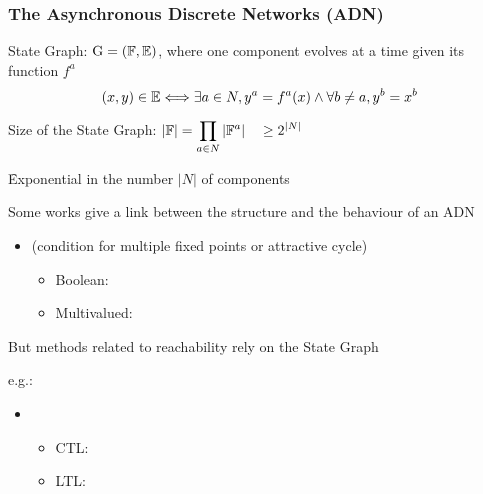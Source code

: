 \begin{frame}[c]
\begin{center}
\bigskip

\end{center}
\end{frame}



\begin{frame}[c]
  \frametitle{The Asynchronous Discrete Networks (ADN)}

State Graph: $\mathrm{G} = (\mathbb{F}, \mathbb{E})$, where one component evolves at a time given its function $f^a$
$$(x, y) \in \mathbb{E} \Longleftrightarrow \exists a \in N, y^a = f^a(x) \wedge \forall b \neq a, y^b = x^b$$


\pause
\medskip
Size of the State Graph: \quad $\displaystyle|\mathbb{F}| = \prod_{a \in N} |\mathbb{F}^a| \quad\geq 2^{|N|}$

\medskip
\f Exponential in the number $|N|$ of components

\pause
\bigskip
Some works give a link between the structure and the behaviour of an ADN
\begin{itemize}
  \item {} (condition for multiple fixed points or attractive cycle)
  \begin{itemize}
    \item Boolean: \tcite{\citeremy}
    \item Multivalued: \tcite{\citerichardcomet}
  \end{itemize}
\end{itemize}

\pause
\medskip
But methods related to reachability rely on the State Graph

e.g.: 
\begin{itemize}
  \item {}
  \begin{itemize}
    \item CTL: \tcite{\citesmbionet}
    \item LTL: \tcite{\citeito}
  \end{itemize}
\end{itemize}
\end{frame}
